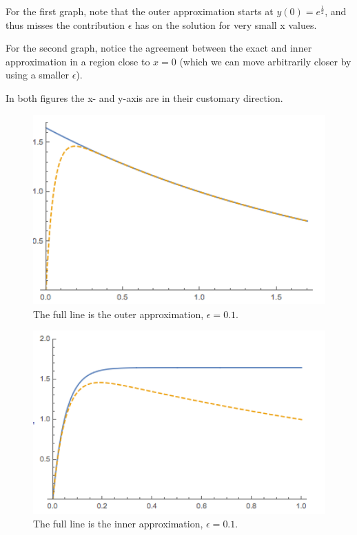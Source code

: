 \documentclass[12pt]{article}
\begin{document}
For the first graph, note that the outer approximation starts at
$y(0)=e^{\frac{1}{2}}$, and thus misses the contribution $\epsilon$
has on the solution for very small x values.

For the second graph, notice the agreement between the exact and inner
approximation in a region close to $x=0$ (which we can move
arbitrarily closer by using a smaller $\epsilon$).

In both figures the x- and y-axis are in their customary direction.

\newpage
\begin{figure}[ht!]
\centering
\includegraphics[width=120mm]
{tmp_ode-outer.png}
\caption{The full line is the outer approximation, $\epsilon=0.1$.}
\label{overflow}
\end{figure}

\begin{figure}[ht!]
\centering
\includegraphics[width=120mm]
{tmp_ode-inner.png}
\caption{The full line is the inner approximation, $\epsilon=0.1$.}
\label{overflow}
\end{figure}
\end{document}
